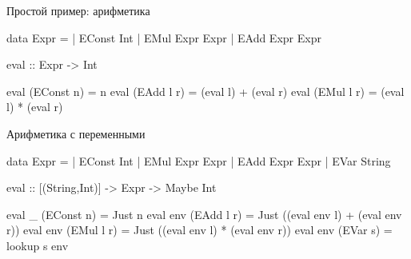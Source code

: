 \documentclass{beamer}
\begin{document}
\begin{frame}[fragile]{Простой пример: арифметика}
\begin{hslisting}
data Expr = 
  | EConst Int
  | EMul Expr Expr
  | EAdd Expr Expr
 
eval :: Expr -> Int
\end{hslisting}
\pause
\begin{hslisting}
eval (EConst n) = n
eval (EAdd l r) = (eval l) + (eval r)
eval (EMul l r) = (eval l) * (eval r)
\end{hslisting}

\end{frame}

\begin{frame}[fragile]{Арифметика с переменными}
\begin{hslisting}
data Expr = 
  | EConst Int
  | EMul Expr Expr
  | EAdd Expr Expr
  | EVar String
 
eval :: [(String,Int)] -> Expr -> Maybe Int
\end{hslisting}
\pause
\begin{hslisting}
eval _ (EConst n) = Just n
eval env (EAdd l r) = 
  Just ((eval env l) + (eval env r))
eval env (EMul l r) = 
  Just ((eval env l) * (eval env r))
eval env (EVar s) = lookup s env 
\end{hslisting}

\end{frame}
\end{document}
